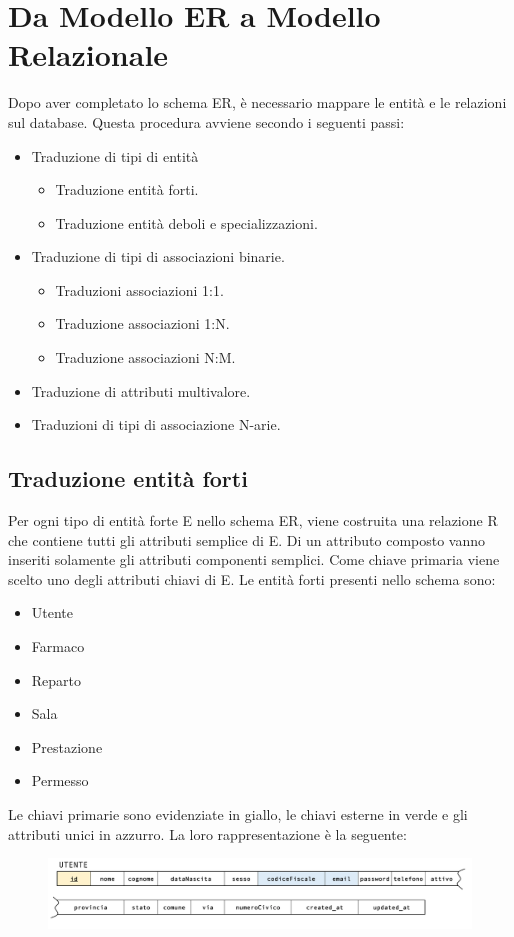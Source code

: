 \documentclass[paper=a4, fontsize=11pt,x11names]{report}
\begin{document}
\chapter{Da Modello ER a Modello Relazionale}
Dopo aver completato lo schema ER, è necessario mappare le entità e le relazioni sul database. Questa procedura avviene secondo i seguenti passi:

\begin{itemize}
\item Traduzione di tipi di entità
\begin{itemize}
\item Traduzione entità forti.
\item Traduzione entità deboli e specializzazioni.
\end{itemize}
\item Traduzione di tipi di associazioni binarie.
\begin{itemize}
\item Traduzioni associazioni 1:1.
\item Traduzione associazioni 1:N.
\item Traduzione associazioni N:M.
\end{itemize} 
\item Traduzione di attributi multivalore.
\item Traduzioni di tipi di associazione N-arie.
\end{itemize}

\section{Traduzione entità forti}
Per ogni tipo di entità forte E nello schema ER, viene costruita una relazione R che contiene tutti gli attributi semplice di E. Di un attributo composto vanno inseriti solamente gli attributi componenti semplici. Come chiave primaria viene scelto uno degli attributi chiavi di E.
Le entità forti presenti nello schema sono:
\begin{itemize}
\item Utente
\item Farmaco
\item Reparto
\item Sala
\item Prestazione
\item Permesso
\end{itemize}
Le chiavi primarie sono evidenziate in giallo, le chiavi esterne in verde e gli attributi unici in azzurro. La loro rappresentazione è la seguente:
\begin{figure}[H]
\begin{center}
\includegraphics[scale=0.3]{utenteSchema}
\end{center}
\end{figure}
\end{document}
